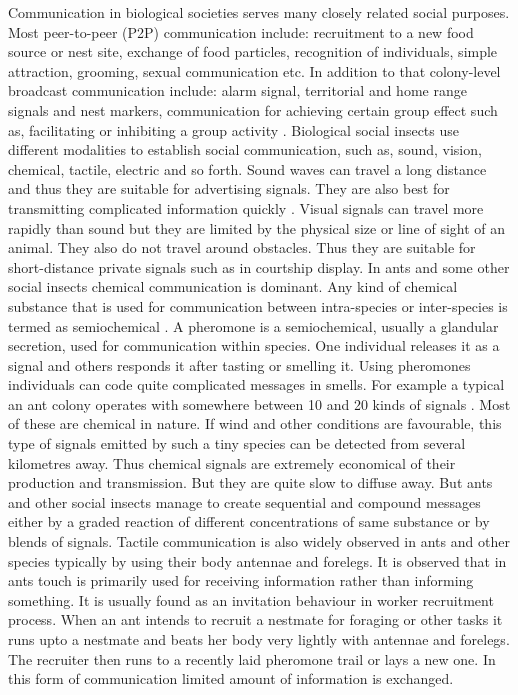 Communication in biological societies serves many closely related social purposes. Most peer-to-peer (P2P) communication include: recruitment to a new food source or nest site, exchange of food particles, recognition of individuals, simple attraction, grooming, sexual communication etc. In addition to that colony-level broadcast communication include: alarm signal, territorial and home range signals and nest markers, communication for achieving certain group effect such as, facilitating or inhibiting  a group activity \cite{Holldobler1990}.
%
Biological social insects use different modalities to establish social communication, such as, sound, vision, chemical, tactile,  electric and so forth.  Sound waves can travel a long distance and thus they are suitable for advertising signals. They are also best for transmitting complicated information quickly \cite{Slater1986}. Visual signals can travel more rapidly than sound but they are limited by the physical size or line of sight of an animal. They also do not travel around obstacles. Thus they are suitable for short-distance private signals such as in courtship display. 
In ants and some other social insects chemical communication is dominant. Any kind of chemical substance that is used for communication between intra-species or inter-species is termed as semiochemical \cite{Holldobler1990}. A pheromone is a semiochemical, usually a glandular secretion, used for communication within species. One individual releases it as a signal and others responds it after tasting or smelling it. Using pheromones individuals can code quite complicated messages in smells. For example a typical an ant colony operates with somewhere between 10 and 20 kinds of signals \cite{Holldobler1990}. Most of these are chemical in nature. If wind and other conditions are favourable,  this type of signals emitted by such a tiny species can be detected from several kilometres away. Thus chemical signals are extremely economical of their production and transmission. But they are quite slow to diffuse away. But ants and other social insects manage to create sequential and compound messages either by a graded reaction of different concentrations of same substance or by blends of signals.
Tactile communication is also widely observed in ants and other species typically by using their body antennae and forelegs. It is observed that in ants touch is primarily used  for receiving information rather than informing something. It is usually found as an invitation behaviour in worker recruitment process. When an ant intends to recruit a nestmate for foraging or other tasks it runs upto a nestmate and beats her body very lightly with  antennae and forelegs. The recruiter then runs to a recently laid pheromone trail or lays a new one. In this form of communication limited amount of information is exchanged. 
